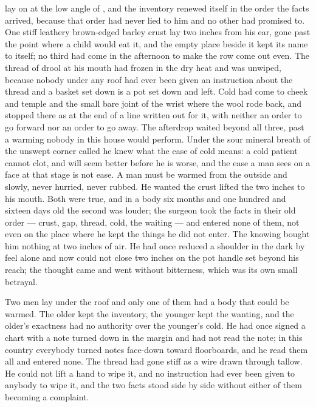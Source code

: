  lay on  at the low angle of , and the inventory renewed itself in the order the facts arrived, because that order had never lied to him and no other had promised to. One stiff leathery brown-edged barley crust lay two inches from his ear, gone past the point where a child would eat it, and the empty place beside it kept its name to itself; no third had come in the afternoon to make the row come out even. The thread of drool at his mouth had frozen in the dry heat and was unwiped, because nobody under any roof had ever been given an instruction about the thread and a basket set down is a pot set down and left. Cold had come to cheek and temple and the small bare joint of the wrist where the wool rode back, and stopped there as at the end of a line written out for it, with neither an order to go forward nor an order to go away. The afterdrop waited beyond all three, past a warming nobody in this house would perform. Under the sour mineral breath of the unswept corner called  he knew what the ease of cold means: a cold patient cannot clot, and will seem better before he is worse, and the ease a man sees on a face at that stage is not ease. A man must be warmed from the outside and slowly, never hurried, never rubbed. He wanted the crust lifted the two inches to his mouth. Both were true, and in a body six months and one hundred and sixteen days old the second was louder; the surgeon took the facts in their old order --- crust, gap, thread, cold, the waiting --- and entered none of them, not even on the place where he kept the things he did not enter. The knowing bought him nothing at two inches of air. He had once reduced a shoulder in the dark by feel alone and now could not close two inches on the pot handle set beyond his reach; the thought came and went without bitterness, which was its own small betrayal.

Two men lay under the roof and only one of them had a body that could be warmed. The older kept the inventory, the younger kept the wanting, and the older's exactness had no authority over the younger's cold. He had once signed a chart with a note turned down in the margin and had not read the note; in this country everybody turned notes face-down toward floorboards, and he read them all and entered none. The thread had gone stiff as a wire drawn through tallow. He could not lift a hand to wipe it, and no instruction had ever been given to anybody to wipe it, and the two facts stood side by side without either of them becoming a complaint.

